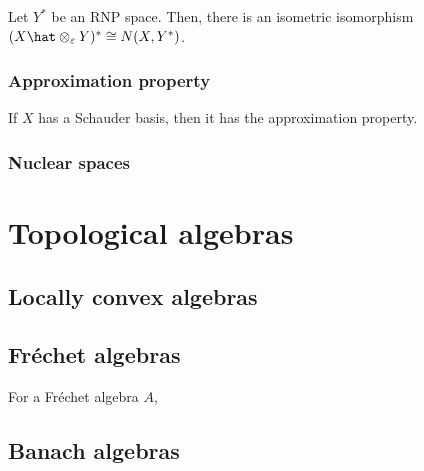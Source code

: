 \documentclass{../../large}
\begin{document}
\begin{prb}
Let $Y^*$ be an RNP space.
Then, there is an isometric isomorphism $(X\hat\otimes_\e Y)^*\cong N(X,Y^*)$.
\end{prb}

\section{Approximation property}

\begin{prb}
\end{prb}

\begin{prb}
\end{prb}

\begin{prb}
\end{prb}

\begin{prb}
\begin{parts}
\item If $X$ has a Schauder basis, then it has the approximation property.
\end{parts}
\end{prb}



\section{Nuclear spaces}










\part{Topological algebras}

\chapter{Locally convex algebras}


\chapter{Fr\'echet algebras}


For a Fr\'echet algebra $A$, 


\chapter{Banach algebras}
\end{document}
